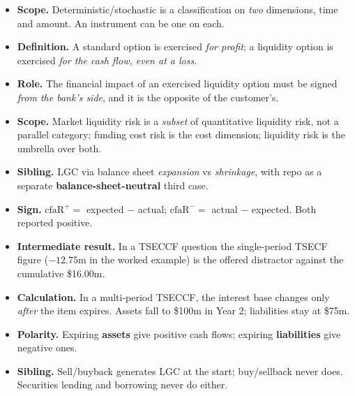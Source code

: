 \begin{lrtrapbox}
\begin{itemize}
\item \textbf{Scope.} Deterministic/stochastic is a classification on \emph{two} dimensions, time and amount. An instrument can be one on each.
\item \textbf{Definition.} A standard option is exercised \emph{for profit}; a liquidity option is exercised \emph{for the cash flow, even at a loss}.
\item \textbf{Role.} The financial impact of an exercised liquidity option must be signed \emph{from the bank's side}, and it is the opposite of the customer's.
\item \textbf{Scope.} Market liquidity risk is a \emph{subset} of quantitative liquidity risk, not a parallel category; funding cost risk is the cost dimension; liquidity risk is the umbrella over both.
\item \textbf{Sibling.} LGC via balance sheet \emph{expansion} vs \emph{shrinkage}, with repo as a separate \textbf{balance-sheet-neutral} third case.
\item \textbf{Sign.} $\text{cfaR}^{+} = $ expected $-$ actual; $\text{cfaR}^{-} = $ actual $-$ expected. Both reported positive.
\item \textbf{Intermediate result.} In a TSECCF question the single-period TSECF figure ($-12.75$m in the worked example) is the offered distractor against the cumulative \$16.00m.
\item \textbf{Calculation.} In a multi-period TSECCF, the interest base changes only \emph{after} the item expires. Assets fall to \$100m in Year 2; liabilities stay at \$75m.
\item \textbf{Polarity.} Expiring \textbf{assets} give positive cash flows; expiring \textbf{liabilities} give negative ones.
\item \textbf{Sibling.} Sell/buyback generates LGC at the start; buy/sellback never does. Securities lending and borrowing never do either.
\end{itemize}
\end{lrtrapbox}

